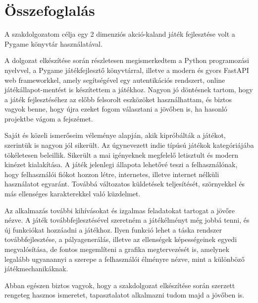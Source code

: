 \chapter{Összefoglalás}

 A szakdolgozatom célja egy 2 dimenziós akció-kaland játék fejlesztése volt a Pygame könyvtár használatával.

A dolgozat elkészítése során részletesen megismerkedtem a Python programozási nyelvvel, a Pygame játékfejlesztő könyvtárral, illetve a modern és gyors FastAPI web frameworkkel, amely segítségével egy autentikációs rendszert, online játékállapot-mentést is készítettem a játékhoz. Nagyon jó döntésnek tartom, hogy a játék fejlesztéséhez az előbb felsorolt eszközöket használhattam, és biztos vagyok benne, hogy újra ezeket fogom választani a jövőben is, ha hasonló projektbe vágom a fejszémet.

Saját és közeli ismerőseim véleménye alapján, akik kipróbálták a játékot, szerintük is nagyon jól sikerült. Az úgynevezett indie típúsú játékok kategóriájába tökéletesen beleillik. Sikerült a mai igényeknek megfelelő letisztult és modern kinézet kialakítása. A játék jelenlegi állapota lehetővé teszi a felhasználónak, hogy felhasználói fiókot hozzon létre, internetes, illetve internet nélküli használatot egyaránt. Továbbá változatos küldetések teljesítését, szörnyekkel és más ellenséges karakterekkel való küzdelmet.

Az alkalmazás további kihívásokat és izgalmas feladatokat tartogat a jövőre nézve. A játék továbbfejlesztésével szeretném a játékélményt még jobbá tenni, és új funkciókat hozzáadni a játékhoz. Ilyen funkció lehet a táska rendszer továbbfejlesztése, a pályagenerálás, illetve az ellenségek képességeinek egyedi megvalósítása, de fontos megemlíteni a grafika megtervezését is, amelynek legalább ugyanannyi a szerepe a felhasználói élményre nézve, mint a különböző játékmechanikáknak.  

Abban egészen biztos vagyok, hogy a szakdolgozat elkészítése során szerzett rengeteg hasznos ismeretet, tapasztalatot alkalmazni tudom majd a jövőben is.

